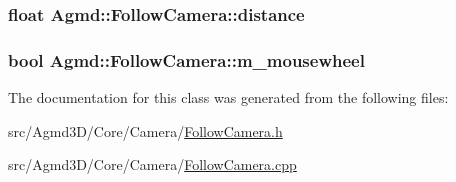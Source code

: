 \hypertarget{class_agmd_1_1_follow_camera_ab53685827a4fc37078210e80b174e3b7}{
\subsubsection[{distance}]{\setlength{\rightskip}{0pt plus 5cm}float Agmd\+::\+Follow\+Camera\+::distance\hspace{0.3cm}{\ttfamily [protected]}}}\label{class_agmd_1_1_follow_camera_ab53685827a4fc37078210e80b174e3b7}
\hypertarget{class_agmd_1_1_follow_camera_a3c50e74860b0dd029b6a9dad0fd9a3ff}{
\subsubsection[{m\+\_\+mousewheel}]{\setlength{\rightskip}{0pt plus 5cm}bool Agmd\+::\+Follow\+Camera\+::m\+\_\+mousewheel\hspace{0.3cm}{\ttfamily [protected]}}}\label{class_agmd_1_1_follow_camera_a3c50e74860b0dd029b6a9dad0fd9a3ff}


The documentation for this class was generated from the following files\+:\begin{DoxyCompactItemize}
\item 
src/\+Agmd3\+D/\+Core/\+Camera/\hyperlink{_follow_camera_8h}{Follow\+Camera.\+h}\item 
src/\+Agmd3\+D/\+Core/\+Camera/\hyperlink{_follow_camera_8cpp}{Follow\+Camera.\+cpp}\end{DoxyCompactItemize}
